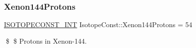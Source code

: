 \subsubsection{\texorpdfstring{Xenon144\+Protons}{Xenon144Protons}}
{\footnotesize\ttfamily \mbox{\hyperlink{group___isotope_const-_macros_ga5f18360b3e99483a35c32d789e62621c}{I\+S\+O\+T\+O\+P\+E\+C\+O\+N\+S\+T\+\_\+\+I\+NT}} Isotope\+Const\+::\+Xenon144\+Protons = 54}

\$ \$ Protons in Xenon-\/144. 